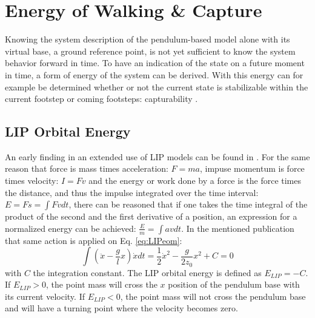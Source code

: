 \section{Energy of Walking \& Capture}\label{sec:ewalking}
Knowing the system description of the pendulum-based model alone with its virtual base, a ground reference point, is not yet sufficient to know the system behavior forward in time. To have an indication of the state on a future moment in time, a form of energy of the system can be derived. With this energy can for example be determined whether or not the current state is stabilizable within the current footstep or coming footsteps: capturability \cite{koolen2012capturability}. 

\subsection{LIP Orbital Energy}\label{subsec:liporbit}
An early finding in an extended use of \ac{LIP} models can be found in \cite{kajita1992dynamic}. For the same reason that force is mass times acceleration: $F=ma$, impuse momentum is force times velocity: $I=Fv$ and the energy or work done by a force is the force times the distance, and thus the impulse integrated over the time interval: $E = Fs = \int Fv dt$, there can be reasoned that if one takes the time integral of the product of the second and the first derivative of a position, an expression for a normalized energy can be achieved: $\frac{E}{m}=\int av dt$. In the mentioned publication that same action is applied on Eq. \eqref{eq:LIPeom}:
\begin{equation}
\int (\ddot{x}-\frac{g}{l}x)\dot{x} dt = \frac{1}{2}\dot{x}^2-\frac{g}{2z_0}x^2 +C=0
\label{eq:Elip}
\end{equation}
with $C$ the integration constant. The \ac{LIP} orbital energy is defined as $E_{LIP}=-C$. If $E_{LIP}>0$, the point mass will cross the $x$ position of the pendulum base with its current velocity. If $E_{LIP}<0$, the point mass will not cross the pendulum base and will have a turning point where the velocity becomes zero.

